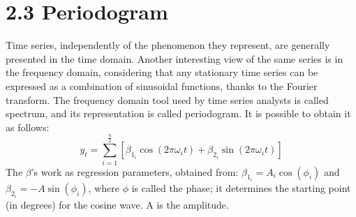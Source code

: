 \documentclass{article}
\begin{document}
\section*{\small 2.3 Periodogram}
Time series, independently of the phenomenon they represent, are generally presented in the time domain. Another interesting view of the same series is in the frequency domain, considering that any stationary time series can be expressed as a combination of sinusoidal functions, thanks to the Fourier transform. The frequency domain tool used by time series analysts is called spectrum, and its representation is called periodogram. It is possible to obtain it as follows:
\begin{equation}
y_t = \sum\limits_{i=1}^{\frac{n}{2}}[\beta_{1_{i}}\cos(2\pi\omega_{i}t) + \beta_{2_{i}}\sin(2\pi\omega_{i}t)]
\end{equation}
The $\beta$'s work as regression parameters, obtained from: $\beta_{1_{i}}=A_{i} \cos(\phi_{i})$ and $\beta_{2_{i}}=-A \sin(\phi_{i})$, where $\phi$ is called the phase; it determines the starting point (in degrees) for the cosine wave. A is the amplitude.
\end{document}
